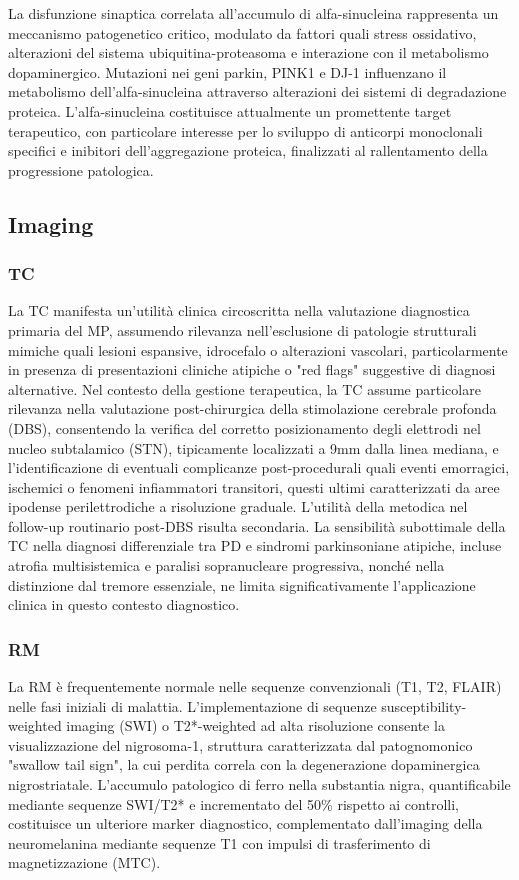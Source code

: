 La disfunzione sinaptica correlata all'accumulo di alfa-sinucleina rappresenta un meccanismo patogenetico critico, modulato da fattori quali stress ossidativo, alterazioni del sistema ubiquitina-proteasoma e interazione con il metabolismo dopaminergico. Mutazioni nei geni parkin, PINK1 e DJ-1 influenzano il metabolismo dell'alfa-sinucleina attraverso alterazioni dei sistemi di degradazione proteica.
L'alfa-sinucleina costituisce attualmente un promettente target terapeutico, con particolare interesse per lo sviluppo di anticorpi monoclonali specifici e inibitori dell'aggregazione proteica, finalizzati al rallentamento della progressione patologica.

\subsection{Imaging}

\subsubsection{TC}
La TC manifesta un'utilità clinica circoscritta nella valutazione diagnostica primaria del MP, assumendo rilevanza nell'esclusione di patologie strutturali mimiche quali lesioni espansive, idrocefalo o alterazioni vascolari, particolarmente in presenza di presentazioni cliniche atipiche o "red flags" suggestive di diagnosi alternative.
Nel contesto della gestione terapeutica, la TC assume particolare rilevanza nella valutazione post-chirurgica della stimolazione cerebrale profonda (DBS), consentendo la verifica del corretto posizionamento degli elettrodi nel nucleo subtalamico (STN), tipicamente localizzati a 9mm dalla linea mediana, e l'identificazione di eventuali complicanze post-procedurali quali eventi emorragici, ischemici o fenomeni infiammatori transitori, questi ultimi caratterizzati da aree ipodense perilettrodiche a risoluzione graduale. L'utilità della metodica nel follow-up routinario post-DBS risulta secondaria.
La sensibilità subottimale della TC nella diagnosi differenziale tra PD e sindromi parkinsoniane atipiche, incluse atrofia multisistemica e paralisi sopranucleare progressiva, nonché nella distinzione dal tremore essenziale, ne limita significativamente l'applicazione clinica in questo contesto diagnostico.

\subsubsection{RM}
La RM è frequentemente normale nelle sequenze convenzionali (T1, T2, FLAIR) nelle fasi iniziali di malattia. L'implementazione di sequenze susceptibility-weighted imaging (SWI) o T2*-weighted ad alta risoluzione consente la visualizzazione del nigrosoma-1, struttura caratterizzata dal patognomonico "swallow tail sign", la cui perdita correla con la degenerazione dopaminergica nigrostriatale. L'accumulo patologico di ferro nella substantia nigra, quantificabile mediante sequenze SWI/T2* e incrementato del 50\% rispetto ai controlli, costituisce un ulteriore marker diagnostico, complementato dall'imaging della neuromelanina mediante sequenze T1 con impulsi di trasferimento di magnetizzazione (MTC).

